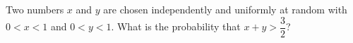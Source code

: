 Two numbers $x$ and $y$ are chosen independently and uniformly at random with $0<x<1$ and $0<y<1$. What is the probability that $x+y>\dfrac32$?
